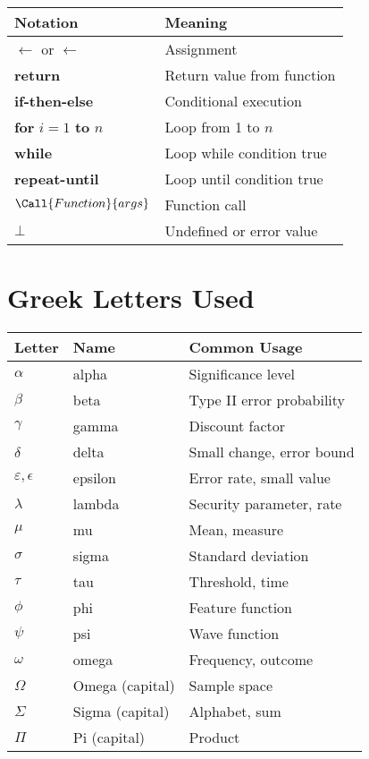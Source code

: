 \begin{center}
\begin{tabular}{|l|l|}
\hline
\textbf{Notation} & \textbf{Meaning} \\
\hline
$\gets$ or $\leftarrow$ & Assignment \\
\textbf{return} & Return value from function \\
\textbf{if-then-else} & Conditional execution \\
\textbf{for} $i = 1$ \textbf{to} $n$ & Loop from 1 to $n$ \\
\textbf{while} & Loop while condition true \\
\textbf{repeat-until} & Loop until condition true \\
$\Call{Function}{args}$ & Function call \\
$\bot$ & Undefined or error value \\
\hline
\end{tabular}
\end{center}

\section{Greek Letters Used}

\begin{center}
\begin{tabular}{|l|l|l|}
\hline
\textbf{Letter} & \textbf{Name} & \textbf{Common Usage} \\
\hline
$\alpha$ & alpha & Significance level \\
$\beta$ & beta & Type II error probability \\
$\gamma$ & gamma & Discount factor \\
$\delta$ & delta & Small change, error bound \\
$\varepsilon, \epsilon$ & epsilon & Error rate, small value \\
$\lambda$ & lambda & Security parameter, rate \\
$\mu$ & mu & Mean, measure \\
$\sigma$ & sigma & Standard deviation \\
$\tau$ & tau & Threshold, time \\
$\phi$ & phi & Feature function \\
$\psi$ & psi & Wave function \\
$\omega$ & omega & Frequency, outcome \\
$\Omega$ & Omega (capital) & Sample space \\
$\Sigma$ & Sigma (capital) & Alphabet, sum \\
$\Pi$ & Pi (capital) & Product \\
\hline
\end{tabular}
\end{center}